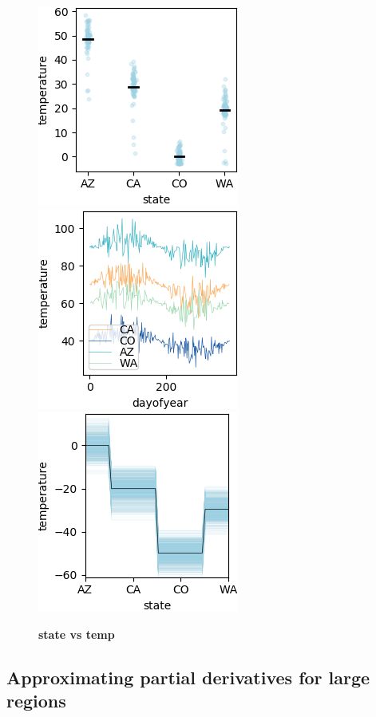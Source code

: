 \documentclass[12pt]{article}
\begin{document}
\begin{figure}[htbp]
\begin{center}
\includegraphics[scale=0.7]{images/state_vs_temp_stratpd.png}
\includegraphics[scale=0.7]{images/dayofyear_vs_temp.png}
\includegraphics[scale=0.7]{images/state_vs_temp_pdp.png}
\caption{{\bf  state  vs temp}}
\label{fig:state_vs_temp}
\end{center}
\end{figure}

\subsection{Approximating partial derivatives for large regions}\label{sec:patho}
\end{document}
